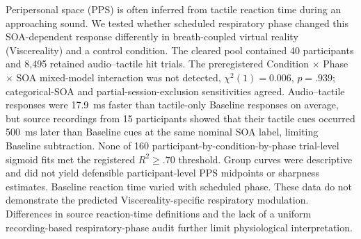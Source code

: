 Peripersonal space (PPS) is often inferred from tactile reaction time during an approaching sound. We tested whether scheduled respiratory phase changed this SOA-dependent response differently in breath-coupled virtual reality (Viscereality) and a control condition. The cleared pool contained 40 participants and 8{,}495 retained audio--tactile hit trials. The preregistered Condition $\times$ Phase $\times$ SOA mixed-model interaction was not detected, $\chi^{2}(1)=0.006$, $p=.939$; categorical-SOA and partial-session-exclusion sensitivities agreed. Audio--tactile responses were 17.9~ms faster than tactile-only Baseline responses on average, but source recordings from 15 participants showed that their tactile cues occurred 500~ms later than Baseline cues at the same nominal SOA label, limiting Baseline subtraction. None of 160 participant-by-condition-by-phase trial-level sigmoid fits met the registered $R^{2}\geq .70$ threshold. Group curves were descriptive and did not yield defensible participant-level PPS midpoints or sharpness estimates. Baseline reaction time varied with scheduled phase. These data do not demonstrate the predicted Viscereality-specific respiratory modulation. Differences in source reaction-time definitions and the lack of a uniform recording-based respiratory-phase audit further limit physiological interpretation.
